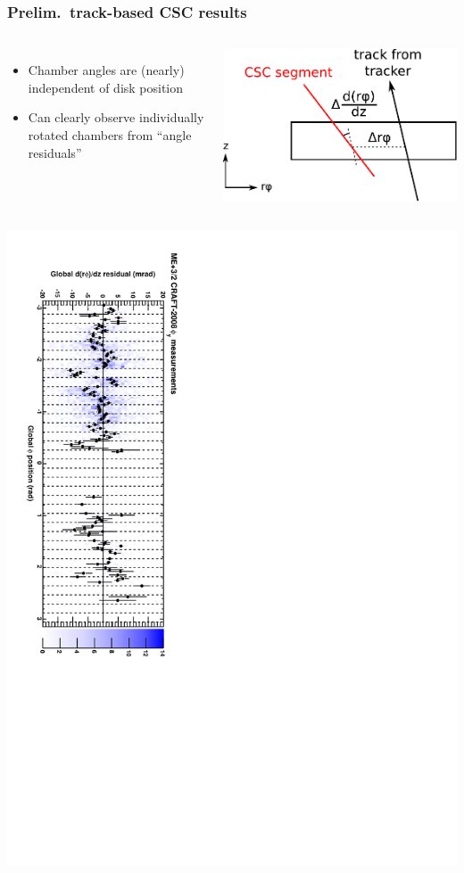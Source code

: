\documentclass[compress]{beamer}
\begin{document}
\begin{frame}
\frametitle{Prelim.\ track-based CSC results}

\vspace{-0.3 cm}
\begin{columns}
\begin{itemize}
\item Chamber angles are (nearly) independent of disk position
\item Can clearly observe individually rotated chambers from ``angle residuals''
\end{itemize}

\vspace{0.7 cm}
\includegraphics[width=\linewidth]{explanation.pdf}
\end{columns}

\vfill
\begin{columns}
\includegraphics[height=\linewidth, angle=90]{correspondance_2008_mep32_phiy.pdf}


\end{columns}
\end{frame}
\end{document}
